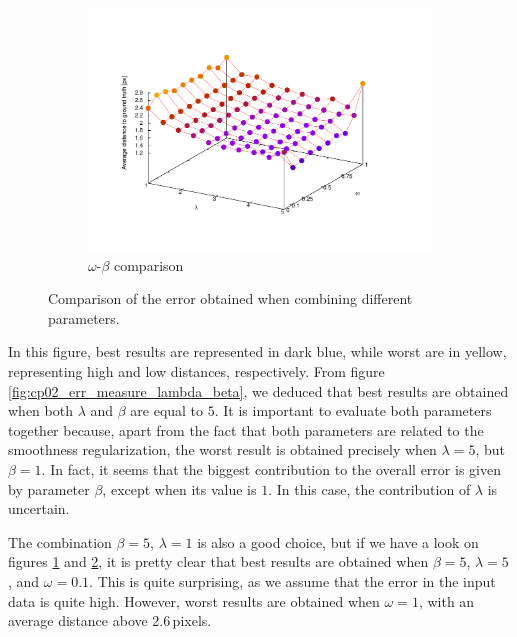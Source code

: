 \begin{figure}[t]
\begin{subfigure}[b]{0.45\textwidth}
                \label{fig:cp02_err_measure_lambda_omega}
        \end{subfigure}
        \begin{subfigure}[b]{0.45\textwidth}
                \centering
                \includegraphics[width=\textwidth, trim=80 80 150 100,clip]{fig26.pdf}
                \caption{$\omega$-$\beta$ comparison}
                \label{fig:cp02_err_measure_omega_beta}
        \end{subfigure}%

        \caption{Comparison of the error obtained when combining different parameters.}\label{fig:cp02_err_measure_parameterization}
\end{figure}

In this figure, best results are represented in dark blue, while worst are in yellow, representing high and low distances, 
respectively. From figure \ref{fig:cp02_err_measure_lambda_beta}, we deduced that best results are obtained when 
both $\lambda$ and $\beta$ are equal to $5$. It is important to evaluate both parameters together because, apart from 
the fact that both parameters are related to the smoothness regularization, the worst result is obtained precisely when 
$\lambda=5$, but $\beta=1$. In fact, it seems that the biggest contribution to the overall error is given by parameter 
$\beta$, except when its value is $1$. In this case, the contribution of $\lambda$ is uncertain.

The combination $\beta = 5$, $\lambda = 1$ is also a good choice, but if we have a look on figures \ref{fig:cp02_err_measure_lambda_omega} and \ref{fig:cp02_err_measure_omega_beta}, it is pretty clear that best results are obtained when $\beta=5$, $\lambda=5$, and $\omega=0.1$. This is quite surprising, as we assume that the error in the input data is quite high. However, worst results are obtained when $\omega=1$, with an average distance above 2.6\,pixels.

